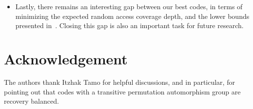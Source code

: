 \documentclass[11pt,a4paper,reqno,twoside]{amsart}
\theoremstyle{definition}
\begin{document}
\begin{itemize}
    \item Lastly, there remains an interesting gap between our best codes, in terms of minimizing the expected random access coverage depth, and the lower bounds presented in~\cite{bar2023cover}. Closing this gap is also an important task for future research. 
\end{itemize}

\section*{Acknowledgement}
The authors thank Itzhak Tamo for helpful discussions, and in particular, for pointing out that codes with a transitive permutation automorphism group are recovery balanced. 


\clearpage
\end{document}

